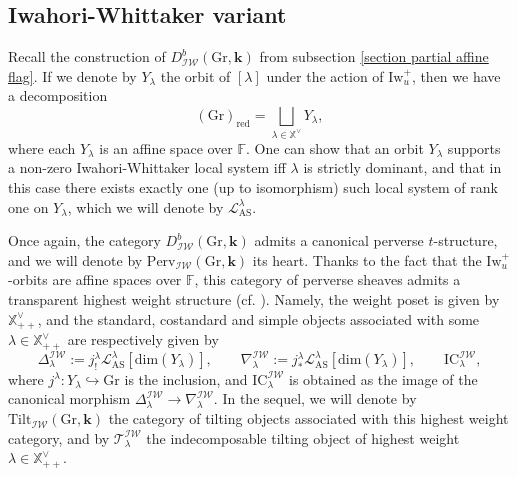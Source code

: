 \documentclass[11pt]{amsart}
\theoremstyle{plain}
\theoremstyle{remark}
\numberwithin{equation}{section}
\begin{document}
	
	\subsection{Iwahori-Whittaker variant}\label{IW variant} Recall the construction of $D^b_{\mathcal{IW}}(\mathrm{Gr},\mathbf{k})$ from subsection \ref{section partial affine flag}. If we denote by $Y_\lambda$ the orbit of $[\lambda]$ under the action of $\mathrm{Iw}_u^+$, then we have a decomposition
	$$(\mathrm{Gr})_{\mathrm{red}}=\bigsqcup_{\lambda\in \mathbb{X}^\vee}Y_\lambda,$$
	where each $Y_\lambda$ is an affine space over $\mathbb{F}$. One can show that an orbit $Y_\lambda$ supports a non-zero Iwahori-Whittaker local system iff $\lambda$ is strictly dominant, and that in this case there exists exactly one (up to isomorphism) such local system of rank one on $Y_\lambda$, which we will denote by $\mathcal{L}^\lambda_{\mathrm{AS}}$.

	Once again, the category $D^b_{\mathcal{IW}}(\mathrm{Gr},\mathbf{k})$ admits a canonical perverse $t$-structure, and we will denote by $\mathrm{Perv}_{\mathcal{IW}}(\mathrm{Gr},\mathbf{k})$ its heart. Thanks to the fact that the $\mathrm{Iw}_u^+$-orbits are affine spaces over $\mathbb{F}$, this category of perverse sheaves admits a transparent highest weight structure (cf. \cite[Corollary 3.6]{JEP_2019__6__707_0}). Namely, the weight poset is given by $\mathbb{X}^\vee_{++}$, and the standard, costandard and simple objects associated with some $\lambda\in\mathbb{X}^\vee_{++}$ are respectively given by
	$$\Delta^{\mathcal{IW}}_\lambda:=j^\lambda_{ !}\mathcal{L}^\lambda_{\mathrm{AS}}[\mathrm{dim}(Y_\lambda)],\qquad \nabla^{\mathcal{IW}}_\lambda:=j^\lambda_{ *}\mathcal{L}^\lambda_{\mathrm{AS}}[\mathrm{dim}(Y_\lambda)],\qquad \mathrm{IC}_\lambda^{\mathcal{IW}},$$
	where $j^\lambda:Y_\lambda\hookrightarrow\mathrm{Gr}$ is the inclusion, and $\mathrm{IC}_\lambda^{\mathcal{IW}}$ is obtained as the image of the canonical morphism $\Delta^{\mathcal{IW}}_\lambda\to \nabla^{\mathcal{IW}}_\lambda$. In the sequel, we will denote by $\mathrm{Tilt}_{\mathcal{IW}}(\mathrm{Gr},\mathbf{k})$ the category of tilting objects associated with this highest weight category, and by $\mathscr{T}^{\mathcal{IW}}_{\lambda}$ the indecomposable tilting object of highest weight $\lambda\in\mathbb{X}^\vee_{++}$.
	
\end{document}
